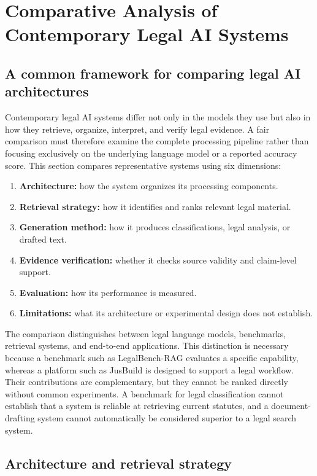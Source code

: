 \section{Comparative Analysis of Contemporary Legal AI Systems}
\label{sec:comparison}

\subsection{A common framework for comparing legal AI architectures}

Contemporary legal AI systems differ not only in the models they use but also in how they retrieve,
organize, interpret, and verify legal evidence. A fair comparison must therefore examine the complete
processing pipeline rather than focusing exclusively on the underlying language model or a reported
accuracy score. This section compares representative systems using six dimensions:
\begin{enumerate}[leftmargin=1.4em, itemsep=2pt, topsep=2pt]
\item \textbf{Architecture:} how the system organizes its processing components.
\item \textbf{Retrieval strategy:} how it identifies and ranks relevant legal material.
\item \textbf{Generation method:} how it produces classifications, legal analysis, or drafted text.
\item \textbf{Evidence verification:} whether it checks source validity and claim-level support.
\item \textbf{Evaluation:} how its performance is measured.
\item \textbf{Limitations:} what its architecture or experimental design does not establish.
\end{enumerate}

The comparison distinguishes between legal language models, benchmarks, retrieval systems, and
end-to-end applications. This distinction is necessary because a benchmark such as LegalBench-RAG
evaluates a specific capability, whereas a platform such as JusBuild is designed to support a legal
workflow. Their contributions are complementary, but they cannot be ranked directly without common
experiments. A benchmark for legal classification cannot establish that a system is reliable at
retrieving current statutes, and a document-drafting system cannot automatically be considered
superior to a legal search system.

\subsection{Architecture and retrieval strategy}

